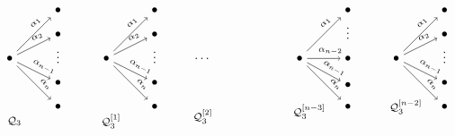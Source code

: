 \documentclass{amsart}
\numberwithin{equation}{section}
\begin{document}
\[
\begin{tikzpicture}[scale=1.35]
  \draw (0,0) node (I1) {$\bullet$} +(1,1) node (J11) {$\bullet$} +(1,.5) node (J12) {$\bullet$} +(1,0.1) node (D1) { $\vdots$}+(1,-.5) node (J1N1) {$\bullet$} +(1,-1) node (J1N) {$\bullet$} +(0.1,-1.3) node {\footnotesize$\mathcal Q_3$}; 
  \draw[->] (I1)--(J11) node[pos=.7,above,sloped]{\scriptsize$\alpha_1$};
  \draw[->] (I1)--(J12) node[pos=.7,above,sloped]{\scriptsize$\alpha_2$};
  \draw[->] (I1)--(J1N1) node[pos=.7,above,sloped]{\scriptsize$\alpha_{n-1}$};
  \draw[->] (I1)--(J1N) node[pos=.7,above,sloped]{\scriptsize$\alpha_{n}$};

  \draw (2,0) node (I2) {$\bullet$} +(1,1) node (J21) {$\bullet$} +(1,.5) node (J22) {$\bullet$}+(1,0.1) node (D2) { $\vdots$} +(1,-.5) node (J2N1) {$\bullet$} +(1,-1) node (J2N) {$\bullet$} +(0.1,-1.3) node (P1) {\footnotesize$\mathcal Q_3^{[1]}$} ; 
  \draw[->] (I2)--(J21) node[pos=.7,above,sloped]{\scriptsize$\alpha_1$};
  \draw[->] (I2)--(J22) node[pos=.7,above,sloped]{\scriptsize$\alpha_2$};
  \draw[->] (I2)--(J2N1) node[pos=.7,above,sloped]{\scriptsize$\alpha_{n-1}$};
  \draw[->] (I2)--(J2N) node[pos=.7,above,sloped]{\scriptsize$\alpha_{n}$};

  \draw (4,0) node (DOTS) {$\dots$}+(0,-1.2) node (P2b) {\footnotesize$\mathcal Q_3^{[2]}$};

  \draw (6,0) node (I3) {$\bullet$} +(1,1) node (J31) {$\bullet$}   +(1,.6) node (D31) { $\vdots$} +(1,0) node (J3N2) {$\bullet$} +(1,-.55) node (J3N1) { $\bullet$} +(1,-1) node (J3N) {$\bullet$} +(0.2,-1.1) node (P3) {\footnotesize$\mathcal Q_3^{[n-3]}$} ; 
  \draw[->] (I3)--(J31) node[pos=.7,above,sloped]{\scriptsize$\alpha_1$};
  \draw[->] (I3)--(J3N2) node[pos=.7,above,sloped]{\scriptsize$\alpha_{n-2}$};
  \draw[->] (I3)--(J3N1) node[pos=.7,above,sloped]{\scriptsize$\alpha_{n-1}$};
  \draw[->] (I3)--(J3N) node[pos=.7,above,sloped]{\scriptsize$\alpha_{n}$};

  \draw (8,0) node (I4) {$\bullet$} +(1,1) node (J41) {$\bullet$} +(1,.5) node (J42) {$\bullet$} +(1,0.1) node (D4) { $\vdots$} +(1,-.5) node (J4N1) {$\bullet$} +(1,-1) node (J4N) {$\bullet$} +(0.2,-1) node (P4) {\footnotesize$\mathcal Q_3^{[n-2]}$}; 
  \draw[->] (I4)--(J41) node[pos=.7,above,sloped]{\scriptsize$\alpha_1$};
  \draw[->] (I4)--(J42) node[pos=.7,above,sloped]{\scriptsize$\alpha_2$};
  \draw[->] (I4)--(J4N1) node[pos=.7,above,sloped]{\scriptsize$\alpha_{n-1}$};
  \draw[->] (I4)--(J4N) node[pos=.7,above,sloped]{\scriptsize$\alpha_{n}$};


\end{tikzpicture}\]
\end{document}
